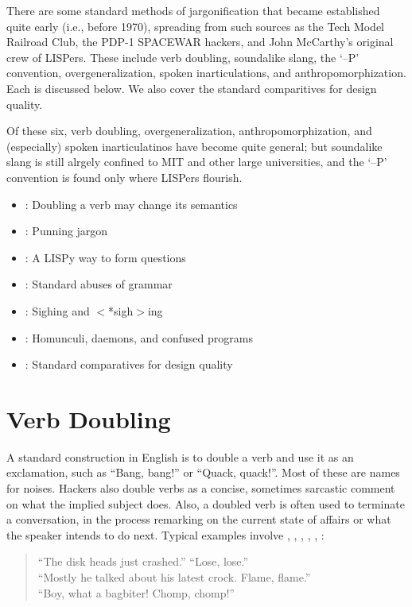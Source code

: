 There are some standard methods of jargonification that became established
quite early (i.e., before 1970), spreading from such sources as the Tech Model
Railroad Club, the PDP-1 SPACEWAR hackers, and John McCarthy's original crew of
LISPers. These include verb doubling, soundalike slang, the `--P' convention,
overgeneralization, spoken inarticulations, and anthropomorphization. Each is
discussed below. We also cover the standard comparitives for design quality.

Of these six, verb doubling, overgeneralization, anthropomorphization, and
(especially) spoken inarticulatinos have become quite general; but soundalike
slang is still alrgely confined to MIT and other large universities, and the
`--P' convention is found only where LISPers flourish.

\begin{itemize}
	\item{}: Doubling a verb may change its semantics
	\item{}: Punning jargon
	\item{}: A LISPy way to form questions
	\item{}: Standard abuses of grammar
	\item{}: Sighing and $<$*sigh$>$ing
	\item{}: Homunculi, daemons, and confused
		programs
	\item{}: Standard comparatives for design quality
\end{itemize}


\section*{Verb Doubling}\label{Verb-Doubling}
	A standard construction in English is to double a verb and use it as an
	exclamation, such as ``Bang, bang!'' or ``Quack, quack!''. Most of these
	are names for noises. Hackers also double verbs as a concise, sometimes
	sarcastic comment on what the implied subject does.  Also, a doubled verb
	is often used to terminate a conversation, in the process remarking on the
	current state of affairs or what the speaker intends to do next. Typical
	examples involve , , ,
	, , :

	\begin{quote}
		``The disk heads just crashed.'' ``Lose, lose.''\\
		``Mostly he talked about his latest crock. Flame, flame.''\\
		``Boy, what a bagbiter! Chomp, chomp!''
	\end{quote}

